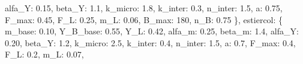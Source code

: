 \documentclass[
]{article}
\newenvironment{Shaded}{}{}
\newcommand{\DecValTok}[1]{\textcolor[rgb]{0.25,0.63,0.44}{#1}}
\newcommand{\FloatTok}[1]{\textcolor[rgb]{0.25,0.63,0.44}{#1}}
\newcommand{\NormalTok}[1]{#1}
\newcommand{\StringTok}[1]{\textcolor[rgb]{0.25,0.44,0.63}{#1}}
\begin{document}
\begin{Shaded}
\begin{Highlighting}[]
                \StringTok{\textquotesingle{}alfa\_Y\textquotesingle{}}\NormalTok{: }\FloatTok{0.15}\NormalTok{, }\StringTok{\textquotesingle{}beta\_Y\textquotesingle{}}\NormalTok{: }\FloatTok{1.1}\NormalTok{,}
                \StringTok{\textquotesingle{}k\_micro\textquotesingle{}}\NormalTok{: }\FloatTok{1.8}\NormalTok{, }\StringTok{\textquotesingle{}k\_inter\textquotesingle{}}\NormalTok{: }\FloatTok{0.3}\NormalTok{, }\StringTok{\textquotesingle{}n\_inter\textquotesingle{}}\NormalTok{: }\FloatTok{1.5}\NormalTok{,}
                \StringTok{\textquotesingle{}a\textquotesingle{}}\NormalTok{: }\FloatTok{0.75}\NormalTok{, }\StringTok{\textquotesingle{}F\_max\textquotesingle{}}\NormalTok{: }\FloatTok{0.45}\NormalTok{, }\StringTok{\textquotesingle{}F\_L\textquotesingle{}}\NormalTok{: }\FloatTok{0.25}\NormalTok{, }\StringTok{\textquotesingle{}m\_L\textquotesingle{}}\NormalTok{: }\FloatTok{0.06}\NormalTok{,}
                \StringTok{\textquotesingle{}B\_max\textquotesingle{}}\NormalTok{: }\DecValTok{180}\NormalTok{, }\StringTok{\textquotesingle{}n\_B\textquotesingle{}}\NormalTok{: }\FloatTok{0.75}
\NormalTok{            \},}
            \StringTok{\textquotesingle{}estiercol\textquotesingle{}}\NormalTok{: \{}
                \StringTok{\textquotesingle{}m\_base\textquotesingle{}}\NormalTok{: }\FloatTok{0.10}\NormalTok{, }\StringTok{\textquotesingle{}Y\_B\_base\textquotesingle{}}\NormalTok{: }\FloatTok{0.55}\NormalTok{, }\StringTok{\textquotesingle{}Y\_L\textquotesingle{}}\NormalTok{: }\FloatTok{0.42}\NormalTok{,}
                \StringTok{\textquotesingle{}alfa\_m\textquotesingle{}}\NormalTok{: }\FloatTok{0.25}\NormalTok{, }\StringTok{\textquotesingle{}beta\_m\textquotesingle{}}\NormalTok{: }\FloatTok{1.4}\NormalTok{,}
                \StringTok{\textquotesingle{}alfa\_Y\textquotesingle{}}\NormalTok{: }\FloatTok{0.20}\NormalTok{, }\StringTok{\textquotesingle{}beta\_Y\textquotesingle{}}\NormalTok{: }\FloatTok{1.2}\NormalTok{,}
                \StringTok{\textquotesingle{}k\_micro\textquotesingle{}}\NormalTok{: }\FloatTok{2.5}\NormalTok{, }\StringTok{\textquotesingle{}k\_inter\textquotesingle{}}\NormalTok{: }\FloatTok{0.4}\NormalTok{, }\StringTok{\textquotesingle{}n\_inter\textquotesingle{}}\NormalTok{: }\FloatTok{1.5}\NormalTok{,}
                \StringTok{\textquotesingle{}a\textquotesingle{}}\NormalTok{: }\FloatTok{0.7}\NormalTok{, }\StringTok{\textquotesingle{}F\_max\textquotesingle{}}\NormalTok{: }\FloatTok{0.4}\NormalTok{, }\StringTok{\textquotesingle{}F\_L\textquotesingle{}}\NormalTok{: }\FloatTok{0.2}\NormalTok{, }\StringTok{\textquotesingle{}m\_L\textquotesingle{}}\NormalTok{: }\FloatTok{0.07}\NormalTok{,}

\end{Highlighting}
\end{Shaded}
\end{document}
